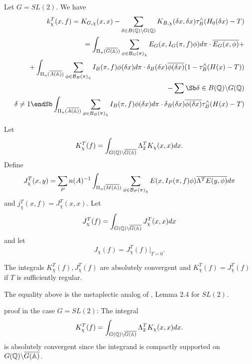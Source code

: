 \begin{example}
Let $G=SL(2)$. We have 
\begin{eqnarray*}
k_\chi ^T(x,f)
=K_{G,\chi }(x,x)-\sum_{\delta \in B({\Bbb{Q}})\backslash G(\Bbb{Q})}
K_{B,\chi }(\delta x,\delta x)
\tau _B^{\wedge }(H_0(\delta x)-T) \\
=\int_{\Pi _u(\overline{G({\Bbb{A}})})}
\sum_{\phi \in {\cal{B}}_G(\pi )_\chi}
E_G(x,I_G(\pi ,f)\phi )d\pi \cdot \overline{E_G(x,\phi )}+ \\
+\int_{\Pi _u(\overline{A({\Bbb{A}})})}
\sum_{\phi \in {\cal{B}}_B(\pi )_\chi }
I_B(\pi,f)\phi (\delta x)d\pi \cdot \delta _B(\delta x)
\overline{\phi (\delta x)}(1-\tau _B^{\wedge }(H(x)-T)) \\
-\sum\Sb \delta \in B({\Bbb{Q}})\backslash G({\Bbb{Q}})
\\ \delta \neq 1 \endSb %
\int_{\Pi _u(\overline{A({\Bbb{A}})})}
\sum_{\phi \in {\cal{B}}_B(\pi )_\chi }I_B(\pi,f)
\phi (\delta x)d\pi \cdot \delta _B(\delta x)
\overline{\phi (\delta x)}\tau _B^{\wedge }(H(x)-T)
\end{eqnarray*}
\end{example}

Let 
\begin{equation}
K_\chi ^T(f)=\int_{G({\Bbb{Q}})\backslash \overline{G({\Bbb{A}})}}
\Lambda _2^TK_\chi (x,x)dx.
\end{equation}
Define 
\begin{equation}
J_\chi ^T(x,y)=\sum_Pn(A)^{-1}
\int_{\Pi _u(\overline{M({\Bbb{A}})})}
\sum_{\phi \in {\cal{B}}_P(\pi )_\chi }
E(x,I_P(\pi ,f)\phi )\overline{\Lambda ^TE(y,\phi )}d\pi
\end{equation}
and $j_\chi ^T(x,f)=J_\chi ^T(x,x)$. Let 
\[
J_\chi ^T(f)
=\int_{G({\Bbb{Q}})\backslash \overline{G({\Bbb{A}})}}
J_\chi ^T(x,x)dx 
\]
and let
\begin{equation}
J_\chi (f)=J_\chi ^T(f)|_{T=0}.
\end{equation}

\begin{lemma}
The integrals $K_\chi ^T(f),J_\chi ^T(f)$ are absolutely convergent and $%
K_\chi ^T(f)=J_\chi ^T(f)$ if $T$ is sufficiently regular.
\end{lemma}

\begin{remark}
The equality above is the metaplectic analog of \cite{A3}, Lemma 2.4
for $SL(2)$.
\end{remark}

proof in the case $G=SL(2)$: The integral 
\[
K_\chi ^T(f)
=\int_{G({\Bbb{Q}})\backslash \overline{G({\Bbb{A}})}}
\Lambda _2^TK_\chi (x,x)dx. 
\]
is absolutely convergent since the integrand is compactly
supported on $G({\Bbb{Q}})\backslash \overline{G({\Bbb{A}})}$.

